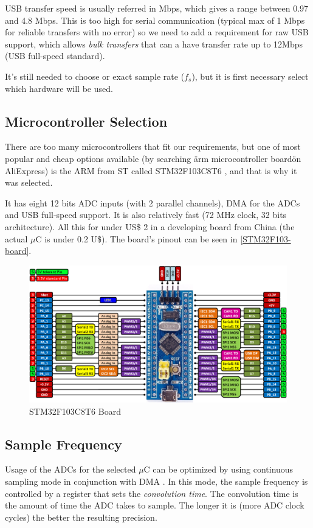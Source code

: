 USB transfer speed is usually referred in Mbps, which gives a range between
0.97 and 4.8 Mbps. This is too high for serial communication (typical max of
1 Mbps for reliable transfers with no error) so we need to add a requirement for raw USB support, which allows \textit{bulk transfers}
that can a have transfer rate up to 12Mbps (USB full-speed standard).

It's still needed to choose or exact sample rate ($f_{s}$), but it is first necessary
select which hardware will be used.

\subsection{Microcontroller Selection}
There are too many microcontrollers that fit our requirements, but one of most popular
and cheap options available (by searching \"arm microcontroller board\" on AliExpress)
is the ARM from ST called STM32F103C8T6 \cite{STM32F103},
and that is why it was selected. 

It has eight 12 bits ADC inputs (with 2 parallel channels), DMA for the ADCs and USB full-speed support. It is
also relatively fast (72 MHz clock, 32 bits architecture). All this for under US\$ 2
in a developing board from China (the actual $\mu$C is under 0.2 U\$).
The board's pinout can be seen in \autoref{STM32F103-board}.

\begin{figure}[htb]
  \centering
  \caption{STM32F103C8T6 Board}
  \label{STM32F103-board}
  \includegraphics[scale=0.3]{images/STM32F103-board}
\end{figure}

\subsection{Sample Frequency}
\label{firmware-sample-frequency}
Usage of the ADCs for the selected $\mu$C can be optimized by using continuous sampling
mode in conjunction with DMA \cite[ch. 11]{STM32F103}. In this mode, the sample frequency is controlled by a register
that sets the \textit{convolution time}. The convolution time is the amount of time
the ADC takes to sample. The longer it is (more ADC clock cycles) the better the resulting precision.

